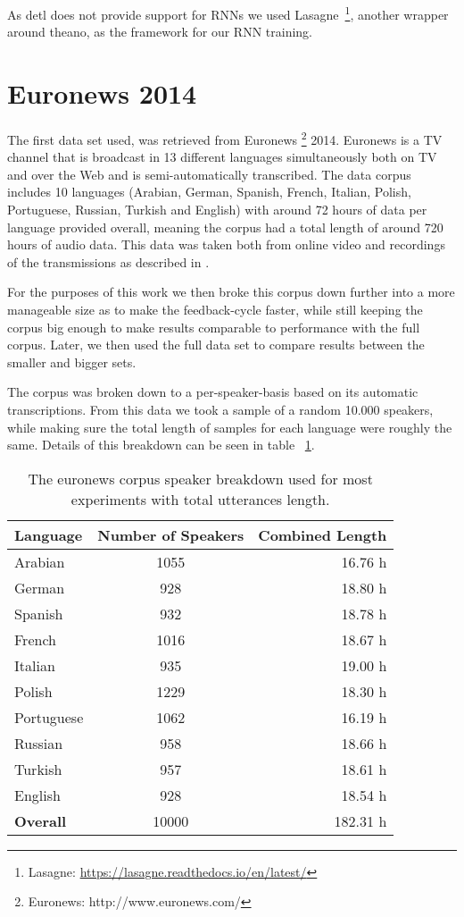 As detl does not provide support for RNNs we used Lasagne~\footnote{Lasagne: \url{https://lasagne.readthedocs.io/en/latest/}}, another wrapper around theano, as the framework for our RNN training.


\section{Euronews 2014}
\label{sec:LITasks:Euronews}


The first data set used, was retrieved from Euronews \footnote{Euronews: http://www.euronews.com/} 2014. Euronews is a TV channel that is broadcast in 13 different languages simultaneously both on TV and over the Web and is semi-automatically transcribed. The data corpus includes 10 languages (Arabian, German, Spanish, French, Italian, Polish, Portuguese, Russian, Turkish and English) with around 72 hours of data per language provided overall, meaning the corpus had a total length of around 720 hours of audio data. This data was taken both from online video and recordings of the transmissions as described in \cite{gretter2014euronews}.

For the purposes of this work we then broke this corpus down further into a more manageable size as to make the feedback-cycle faster, while still keeping the corpus big enough to make results comparable to performance with the full corpus. Later, we then used the full data set to compare results between the smaller and bigger sets.

The corpus was broken down to a per-speaker-basis based on its automatic transcriptions. From this data we took a sample of a random 10.000 speakers, while making sure the total length of samples for each language were roughly the same. Details of this breakdown can be seen in table ~\ref{tab:spkData}.

\begin{table}[h!]
\label{tab:spkData}
\centering
\begin{tabular}{| l | c | r | }
	\hline
	\textbf{Language} & \textbf{Number of Speakers} & \textbf{Combined Length} \\
	\hline
	Arabian & 1055 & 16.76 h \\
	German & 928 & 18.80 h \\
	Spanish & 932 & 18.78 h \\
	French & 1016 & 18.67 h \\  
	Italian & 935 & 19.00 h \\  
	Polish & 1229 & 18.30 h \\ 
	Portuguese & 1062 & 16.19 h \\ 
	Russian & 958 & 18.66 h \\ 
	Turkish & 957 & 18.61 h \\  
	English & 928 & 18.54 h \\ 
	\hline
	\textbf{Overall} & 10000 & 182.31 h\\
	\hline
	
\end{tabular}
\caption{The euronews corpus speaker breakdown used for most experiments with total utterances length.}
\end{table}

